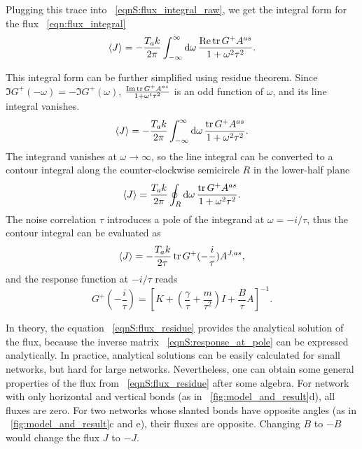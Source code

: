 \documentclass[
 amsmath,amssymb,
 aps,
 pre,
 longbibliography,
 10pt, onecolumn,
 notitlepage
]{revtex4-1}
\begin{document}
Plugging this trace into \eqnname~\eqref{eqnS:flux_integral_raw}, we get the integral form for the flux \eqnname~\eqref{eqn:flux_integral}
\begin{equation}
\expval{J} = -\frac{T_ak}{2\pi} \int_{-\infty}^{\infty} \dd{\omega} \frac{\Re \tr G^+A^{as}}{1+\omega^2\tau^2} .
\end{equation}

This integral form can be further simplified using residue theorem.
Since $\Im G^+(-\omega) = -\Im G^+(\omega)$,
$\frac{\Im \tr G^+A^{as}}{1+\omega^t\tau^2}$ is an odd function of
$\omega$, and its line integral vanishes.
\begin{equation}
\expval{J} = -\frac{T_ak}{2\pi} \int_{-\infty}^{\infty} \dd{\omega} \frac{\tr G^+A^{as}}{1+\omega^2\tau^2} .
\end{equation}
The integrand vanishes at $\omega \rightarrow \infty$, so the line
integral can be converted to a contour integral along the
counter-clockwise semicircle $R$ in the lower-half plane
\begin{equation}
\expval{J} = \frac{T_ak}{2\pi} \oint_R \dd{\omega} \frac{\tr G^+A^{as}}{1+\omega^2\tau^2} .
\end{equation}
The noise correlation $\tau$ introduces a pole of the integrand at $\omega=-i/\tau$, thus the contour integral can be evaluated as
\begin{equation} \label{eqnS:flux_residue}
\expval{J} = -\frac{T_ak}{2\tau} \tr G^+(-\frac{i}{\tau})A^{J,as} ,
\end{equation}
and the response function at $-i/\tau$ reads
\begin{equation} \label{eqnS:response_at_pole}
G^+(-\frac{i}{\tau})
= [K + (\frac{\gamma}{\tau} + \frac{m}{\tau^2})I + \frac{B}{\tau}A]^{-1} .
\end{equation}

In theory, the equation \eqnname~\eqref{eqnS:flux_residue} provides the analytical solution of the flux, because the inverse matrix \eqnname~\eqref{eqnS:response_at_pole} can be expressed analytically.
In practice, analytical solutions can be easily calculated for small networks, but hard for large networks.
Nevertheless, one can obtain some general properties of the flux from \eqnname~\eqref{eqnS:flux_residue} after some algebra. For network with only horizontal and vertical bonds (as in \figurename~\ref{fig:model_and_result}d), all fluxes are zero. For two networks whose slanted bonds have opposite angles (as in \figurename~\ref{fig:model_and_result}c and e), their fluxes are opposite. Changing $B$ to $-B$ would change the flux $J$ to $-J$.
\end{document}
